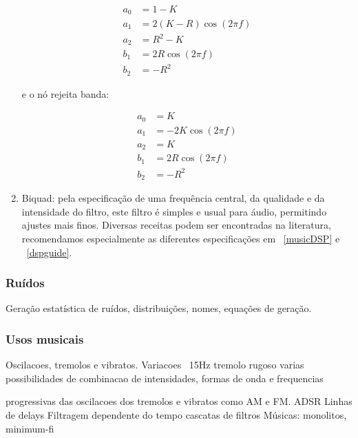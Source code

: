 \begin{enumerate}
\begin{equation}\label{eq:passa-banda}
\begin{split}
a_0 & =  1 - K \\
a_1 & =  2(K-R)\cos (2\pi f) \\
a_2 & =  R^2-K \\
b_1 & =  2R \cos (2\pi f) \\
b_2 & =  -R^2
\end{split}
\end{equation}

e o nó rejeita banda:

\begin{equation}\label{eq:rejeita-banda}
\begin{split}
a_0 & =  K \\
a_1 & =  -2K\cos (2\pi f) \\
a_2 & =  K \\
b_1 & =  2R \cos (2\pi f) \\
b_2 & =  -R^2
\end{split}
\end{equation}


\item Biquad: pela especificação de uma frequência central, da qualidade
e da intensidade do filtro, este filtro é simples e usual para áudio,
permitindo ajustes mais finos. Diversas receitas podem ser encontradas
na literatura, recomendamos especialmente as diferentes especificações
em ~\ref{musicDSP} e ~\ref{dspguide}.

\end{enumerate}

\subsubsection{Ruídos}
Geração estatística de ruídos, distribuições, nomes, equações de geração.


\subsubsection{Usos musicais}
Oscilacoes, tremolos e vibratos. Variacoes
~15Hz tremolo rugoso
varias possibilidades de combinacao de intensidades, formas de onda e frequencias



progressivas das oscilacoes dos tremolos e vibratos
como AM e FM.
ADSR
Linhas de delays
Filtragem dependente do tempo
cascatas de filtros
Músicas: monolitos, minimum-fi



